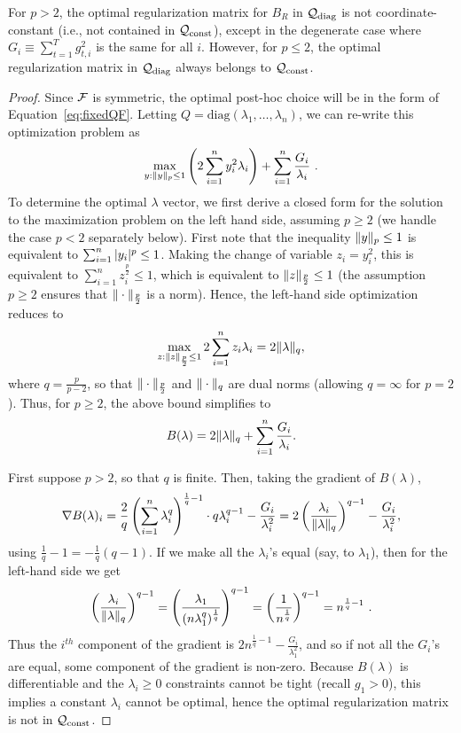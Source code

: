\begin{theorem}\label{thm:lp_posthoc}
For $p > 2$, the optimal regularization matrix for $B_R$ in $\mathcal{Q}_{\text{diag}}$
is not coordinate-constant (i.e., not contained in $\mathcal{Q}_{\text{const}}$), except
in the degenerate case where $G_i \equiv \sum_{t=1}^T g_{t, i}^2$ is
the same for all $i$.  However, for $p \le 2$, the optimal
regularization matrix in $\mathcal{Q}_{\text{diag}}$ always belongs to $\mathcal{Q}_{\text{const}}$.
\end{theorem}
\begin {proof}
Since $\mathcal{F}$ is symmetric, the optimal post-hoc choice will be in the form of
Equation~\eqref{eq:fixedQF}.  Letting $Q = \text{diag}(\lambda_1,
\dots, \lambda_n)$, we can re-write this optimization problem as 
\begin {equation} \label {eq:lp_bound_opt}
\max_{ y : \| y \|_p \leq 1} \left( 2 \sum_{i=1}^n y_i^2 \lambda_i \right) 
   + \sum_{i=1}^n \frac {G_i} {\lambda_i} \mbox { .}
\end {equation}
To determine the optimal
$\lambda$ vector, we first derive a closed form for the solution to
the maximization problem on the left hand side, assuming $p \ge 2$ (we handle the case
$p < 2$ separately below).
First note that the
inequality $\| y \|_p \le 1$ is equivalent to $\sum_{i=1}^n
|y_i|^p \le 1$.  Making the change of variable $z_i =
y_i^2$, this is equivalent to $\sum_{i=1}^n z_i^{\frac p 2} \le
1$, which is equivalent to $\| z \|_{\frac p 2} \le 1$
(the assumption $p \ge 2$ ensures that $\| \cdot \|_{\frac p 2}$ is a norm).
Hence, the left-hand side optimization reduces to
\[
\max_{ z : \| z \|_{\frac{p}{2}} \leq 1} 2 \sum_{i=1}^n z_i \lambda_i
 = 2 \| \lambda \|_{q},
\]
where $q = \frac {p} {p-2}$, so that $\| \cdot \|_{\frac p 2}$ and $\| \cdot \|_q$ are
dual norms (allowing $q = \infty$ for $p = 2$).
Thus, for $p \ge 2$, the above bound simplifies to
\begin {equation} \label {eq:big_p_post}
B(\lambda) = 2\| \lambda \|_q + \sum_{i=1}^n \frac {G_i} {\lambda_i}.
\end {equation}

First suppose $p > 2$, so that $q$ is finite.  Then, taking the
gradient of $B(\lambda)$,
\[
\nabla B(\lambda)_i = \frac 2 q \left( 
  \sum_{i=1}^n \lambda_i^q \right)^{\frac 1 q - 1} \cdot q \lambda_i^{q-1} 
     - \frac {G_i} {\lambda_i^2}
  = 2\left( \frac {\lambda_i} {\| \lambda \|_q} \right)^{q-1} 
     - \frac {G_i} {\lambda_i^2},
\]
using $\frac{1}{q} - 1 = -\frac{1}{q}(q -1)$.  If we make
all the $\lambda_i$'s equal (say, to $\lambda_1$), then for the left-hand side we get
\[
\left( \frac {\lambda_i} {\| \lambda \|_q} \right)^{q-1} 
  = \left( \frac {\lambda_1} {(n \lambda_1^q)^{\frac 1 q}} \right)^{q-1} 
  = \left(\frac {1} {n^{\frac 1 q}}\right)^{q - 1} = n^{\frac 1 q - 1} \mbox { .}
\]
Thus the $i^{th}$ component of the gradient is $2n^{\frac 1 q - 1} -
\frac {G_i} {\lambda_1^2}$, and so if not all the $G_i$'s are
equal, some component of the gradient is non-zero.  Because
$B(\lambda)$ is differentiable and the $\lambda_i \geq 0$ constraints
cannot be tight (recall $g_1 > 0$), this implies a constant
$\lambda_i$ cannot be optimal, hence the optimal regularization matrix
is not in $\mathcal{Q}_{\text{const}}$.


\end{proof}
